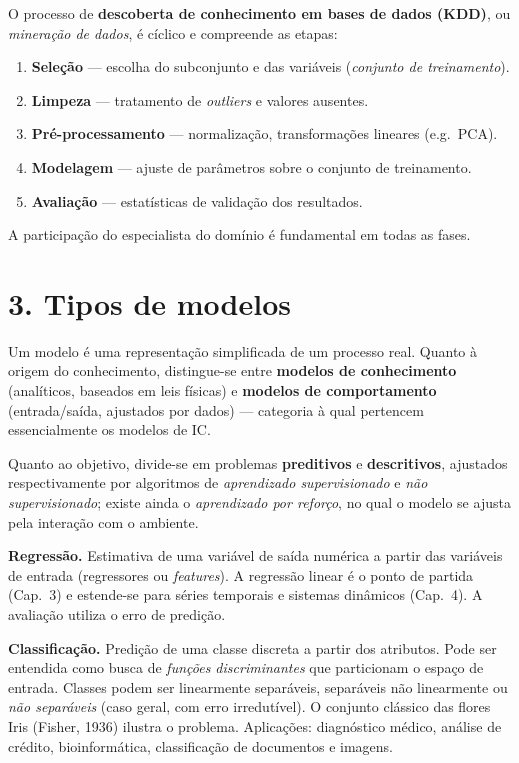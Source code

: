\documentclass[11pt,a4paper]{article}
\begin{document}
O processo de \textbf{descoberta de conhecimento em bases de dados (KDD)}, ou
\emph{mineração de dados}, é cíclico e compreende as etapas:
\begin{enumerate}[leftmargin=1.4em, itemsep=1pt, topsep=2pt]
  \item \textbf{Seleção} --- escolha do subconjunto e das variáveis (\emph{conjunto de treinamento}).
  \item \textbf{Limpeza} --- tratamento de \emph{outliers} e valores ausentes.
  \item \textbf{Pré-processamento} --- normalização, transformações lineares (e.g.\ PCA).
  \item \textbf{Modelagem} --- ajuste de parâmetros sobre o conjunto de treinamento.
  \item \textbf{Avaliação} --- estatísticas de validação dos resultados.
\end{enumerate}
A participação do especialista do domínio é fundamental em todas as fases.

\section*{3. Tipos de modelos}

Um modelo é uma representação simplificada de um processo real. Quanto à origem do
conhecimento, distingue-se entre \textbf{modelos de conhecimento} (analíticos, baseados
em leis físicas) e \textbf{modelos de comportamento} (entrada/saída, ajustados por
dados) --- categoria à qual pertencem essencialmente os modelos de IC.

Quanto ao objetivo, divide-se em problemas \textbf{preditivos} e \textbf{descritivos},
ajustados respectivamente por algoritmos de \emph{aprendizado supervisionado} e
\emph{não supervisionado}; existe ainda o \emph{aprendizado por reforço}, no qual o
modelo se ajusta pela interação com o ambiente.

\textbf{Regressão.} Estimativa de uma variável de saída numérica a partir das
variáveis de entrada (regressores ou \emph{features}). A regressão linear é o ponto de
partida (Cap.\ 3) e estende-se para séries temporais e sistemas dinâmicos (Cap.\ 4).
A avaliação utiliza o erro de predição.

\textbf{Classificação.} Predição de uma classe discreta a partir dos atributos. Pode
ser entendida como busca de \emph{funções discriminantes} que particionam o espaço de
entrada. Classes podem ser linearmente separáveis, separáveis não linearmente ou
\emph{não separáveis} (caso geral, com erro irredutível). O conjunto clássico das
flores Iris (Fisher, 1936) ilustra o problema. Aplicações: diagnóstico médico, análise
de crédito, bioinformática, classificação de documentos e imagens.
\end{document}
